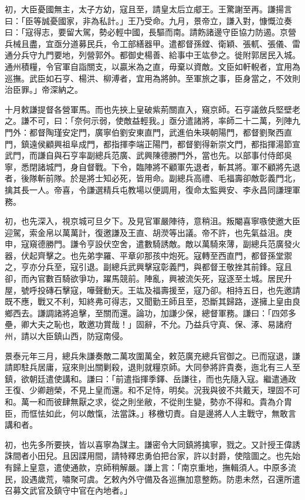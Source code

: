 \begin{pinyinscope}
初，大臣憂國無主，太子方幼，寇且至，請皇太后立郕王。王驚謝至再。謙揚言曰：「臣等誠憂國家，非為私計。」王乃受命。九月，景帝立，謙入對，慷慨泣奏曰：「寇得志，要留大駕，勢必輕中國，長驅而南。請飭諸邊守臣協力防遏。京營兵械且盡，宜亟分道募民兵，令工部繕器甲。遣都督孫鏜、衛穎、張軏、張儀、雷通分兵守九門要地，列營郭外。都御史楊善、給事中王竑參之。徙附郭居民入城。通州積糧，令官軍自詣關支，以贏米為之直，毋棄以資敵。文臣如軒輗者，宜用為巡撫。武臣如石亨、楊洪、柳溥者，宜用為將帥。至軍旅之事，臣身當之，不效則治臣罪。」帝深納之。

十月敕謙提督各營軍馬。而也先挾上皇破紫荊關直入，窺京師。石亨議斂兵堅壁老之。謙不可，曰：「奈何示弱，使敵益輕我。」亟分遣諸將，率師二十二萬，列陣九門外：都督陶瑾安定門，廣寧伯劉安東直門，武進伯朱瑛朝陽門，都督劉聚西直門，鎮遠侯顧興祖阜成門，都指揮李端正陽門，都督劉得新崇文門，都指揮湯節宣武門，而謙自與石亨率副總兵范廣、武興陳德勝門外，當也先。以部事付侍郎吳寧，悉閉諸城門，身自督戰。下令，臨陣將不顧軍先退者，斬其將。軍不顧將先退者，後隊斬前隊。於是將士知必死，皆用命。副總兵高禮、毛福壽卻敵彰義門北，擒其長一人。帝喜，令謙選精兵屯教場以便調用，復命太監興安、李永昌同謙理軍務。

初，也先深入，視京城可旦夕下。及見官軍嚴陣待，意稍沮。叛閹喜寧嗾使邀大臣迎駕，索金帛以萬萬計，復邀謙及王直、胡濙等出議。帝不許，也先氣益沮。庚申，寇窺德勝門。謙令亨設伏空舍，遣數騎誘敵。敵以萬騎來薄，副總兵范廣發火器，伏起齊擊之。也先弟孛羅、平章卯那孩中炮死。寇轉至西直門，都督孫堂禦之，亨亦分兵至，寇引退。副總兵武興擊寇彰義門，與都督王敬挫其前鋒。寇且卻，而內官數百騎欲爭功，躍馬競前。陣亂，興被流矢死，寇逐至土城。居民升屋，號呼投磚石擊寇，嘩聲動天。王竑及福壽援至，寇乃卻。相持五日，也先邀請既不應，戰又不利，知終弗可得志，又聞勤王師且至，恐斷其歸路，遂擁上皇由良鄉西去。謙調諸將追擊，至關而還。論功，加謙少保，總督軍務。謙曰：「四郊多壘，卿大夫之恥也，敢邀功賞哉！」固辭，不允。乃益兵守真、保、涿、易諸府州，請以大臣鎮山西，防寇南侵。

景泰元年三月，總兵朱謙奏敵二萬攻圍萬全，敕范廣充總兵官御之。已而寇退，謙請即駐兵居庸，寇來則出關剿殺，退則就糧京師。大同參將許貴奏，迤北有三人至鎮，欲朝廷遣使講和。謙曰：「前遣指揮季鐸、岳謙往，而也先隨入寇。繼遣通政王復、少卿趙榮，不見上皇而還。和不足恃，明矣。況我與彼不共戴天，理固不可和。萬一和而彼肆無厭之求，從之則坐敝，不從則生變，勢亦不得和。貴為介胄臣，而恇怯如此，何以敵愾，法當誅。」移檄切責。自是邊將人人主戰守，無敢言講和者。

初，也先多所要挾，皆以喜寧為謀主。謙密令大同鎮將擒寧，戮之。又計授王偉誘誅間者小田兒。且因諜用間，請特釋忠勇伯把台家，許以封爵，使陰圖之。也先始有歸上皇意，遣使通款，京師稍解嚴。謙上言：「南京重地，撫輯須人。中原多流民，設遇歲荒，嘯聚可虞。乞敕內外守備及各巡撫加意整飭。防患未然，召還所遣召募文武官及鎮守中官在內地者。」


\end{pinyinscope}
